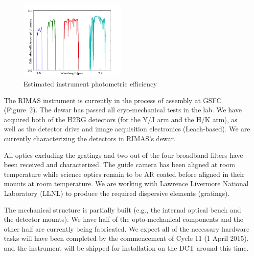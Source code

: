 \documentclass[letterpaper,11pt]{article}
\begin{document}
\begin{figure}[tp!]
\begin{center}
\includegraphics[width=0.47\textwidth]{figures/slide5.jpg}
\vspace{-0.7cm}
\end{center}
\caption{\footnotesize
{ Estimated instrument photometric efficiency}}
\label{fig2}
\end{figure}

\smallskip

The RIMAS instrument is currently in the process of assembly at GSFC (Figure~2).
The dewar has passed all cryo-mechanical tests in the lab.  We have acquired both of the H2RG detectors (for the Y/J 
arm and the H/K arm), as well as the detector drive and image acquisition electronics
(Leach-based).  We are currently characterizing the detectors in RIMAS's dewar.

All optics excluding the gratings and two out of the four broadband filters have been received and characterized.  
The guide camera has been aligned at room temperature while science optics remain to be AR 
coated before aligned in their mounts at room temperature. We are working with Lawrence Livermore 
National Laboratory (LLNL) to produce the required dispersive elements (gratings).  

The mechanical structure is partially built (e.g., the internal optical bench and 
the detector mounts).  We have half of the opto-mechanical components and the other half 
are currently being fabricated.   We expect all of the necessary 
hardware tasks will have been completed by the commencement of Cycle 11 (1 April 2015), 
and the instrument will be shipped for installation on the DCT around this time.

\smallskip
\end{document}
